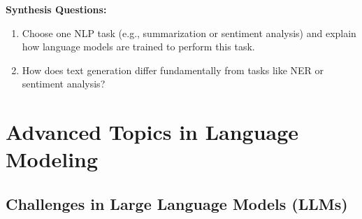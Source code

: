 \begin{questionbox}
\textbf{Synthesis Questions:}

\begin{enumerate}
    \item Choose one NLP task (e.g., summarization or sentiment analysis) and explain how language models are trained to perform this task.
    \item How does text generation differ fundamentally from tasks like NER or sentiment analysis?
\end{enumerate}

\end{questionbox}

\section{Advanced Topics in Language Modeling}

\subsection{Challenges in Large Language Models (LLMs)}

